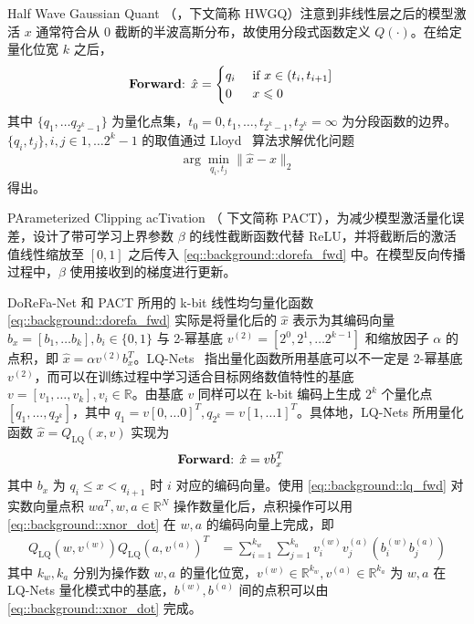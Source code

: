 \documentclass[
  fontset = mac,
]{shtthesis}
\begin{document}
Half Wave Gaussian Quant （\citet{cai2017deep}，下文简称 HWGQ）注意到非线性层之后的模型激活 $x$ 通常符合从 0 截断的半波高斯分布，故使用分段式函数定义 $Q(\cdot)$。在给定量化位宽 $k$ 之后，
\begin{align}
  \text{\textbf{Forward}: } & \hat{x} = 
    \begin{cases} 
      q_i & \text{ if } x \in (t_i, t_{i+1}] \\
      0 & \text{ } x \le 0
    \end{cases}
    \label{eq::background::hwgq}
\end{align}
其中 $\{q_1, \ldots q_{2^k-1}\}$ 为量化点集，$t_0=0, t_1, \ldots, t_{2^k-1}, t_{2^k}=\infty$ 为分段函数的边界。$\{q_i, t_j\}, i, j \in {1, \ldots 2^k-1}$ 的取值通过 Lloyd~\citep{lloyd1982least} 算法求解优化问题
\begin{align}
  \arg\min_{q_i, t_j} \|\hat{x} - x\|_2
\end{align}
得出。

PArameterized Clipping acTivation （\citet{choi2018pact} 下文简称 PACT），为减少模型激活量化误差，设计了带可学习上界参数 $\beta$ 的线性截断函数代替 ReLU，并将截断后的激活值线性缩放至 $[0, 1]$ 之后传入 \eqref{eq::background::dorefa_fwd} 中。在模型反向传播过程中，$\beta$ 使用接收到的梯度进行更新。 

DoReFa-Net 和 PACT 所用的 k-bit 线性均匀量化函数 \eqref{eq::background::dorefa_fwd} 实际是将量化后的 $\hat{x}$ 表示为其编码向量 $b_x = [b_1, \ldots b_k], b_i \in \{0, 1\}$ 与 2-幂基底 $v^{(2)} = [2^0, 2^1, \ldots 2^{k-1}]$ 和缩放因子 $\alpha$ 的点积，即 $\hat{x} = \alpha v^{(2)} b_x^T$。LQ-Nets~\citep{Zhang_2018} 指出量化函数所用基底可以不一定是 2-幂基底 $v^{(2)}$，而可以在训练过程中学习适合目标网络数值特性的基底 $v = [v_1, \ldots, v_k], v_i \in \mathbb{R}$。由基底 $v$ 同样可以在 k-bit 编码上生成 $2^k$ 个量化点 $[q_1, \ldots, q_{2^k}]$，其中 $q_1 = v [0, \ldots 0]^T, q_{2^k} = v [1, \ldots 1]^T$。具体地，LQ-Nets 所用量化函数 $\hat{x} = Q_{\mathrm{LQ}}(x, v)$ 实现为
\begin{align}
  \text{\textbf{Forward}: } & \hat{x} = v b_x^T \label{eq::background::lq_fwd}
\end{align}
其中 $b_x$ 为 $q_i \le x < q_{i+1}$ 时 $i$ 对应的编码向量。使用 \eqref{eq::background::lq_fwd} 对实数向量点积 $wa^T, w, a \in \mathbb{R}^N$ 操作数量化后，点积操作可以用 \eqref{eq::background::xnor_dot} 在 $w, a$ 的编码向量上完成，即
\begin{align}
  Q_{\mathrm{LQ}}(w, v^{(w)}) Q_{\mathrm{LQ}}(a, v^{(a)})^T &= \sum_{i=1}^{k_w} \sum_{j=1}^{k_a} v^{(w)}_i v^{(a)}_{j} (b^{(w)}_i b^{(a)}_j)
\end{align}
其中 $k_w, k_a$ 分别为操作数 $w, a$ 的量化位宽，$v^{(w)} \in \mathbb{R}^{k_w}, v^{(a)} \in \mathbb{R}^{k_a}$ 为 $w, a$ 在 LQ-Nets 量化模式中的基底，$b^{(w)}, b^{(a)}$ 间的点积可以由 \eqref{eq::background::xnor_dot} 完成。
\end{document}
